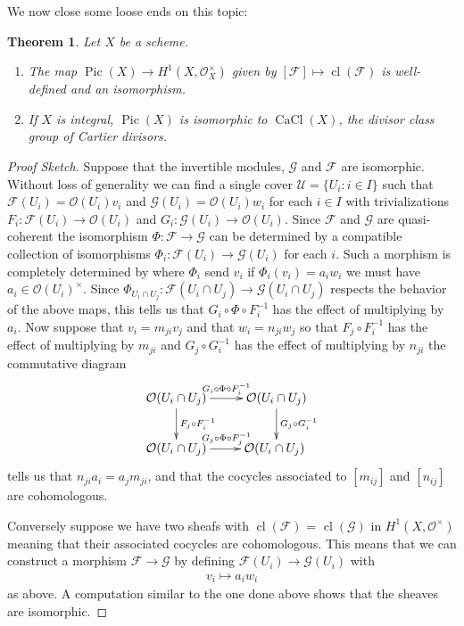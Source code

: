 \documentclass[12pt]{article}
\numberwithin{equation}{section}
\newtheorem{theorem}{Theorem}[subsection]
\theoremstyle{definition}
\theoremstyle{remark}
\newcommand{\Ocal}{\mathcal{O}}
\newcommand{\CaCl}{\operatorname{CaCl}}
\newcommand{\Pic}{\operatorname{Pic}}
\newcommand{\Fcal}{\mathcal{F}}
\newcommand{\cl}{\operatorname{cl}}
\begin{document}
We now close some loose ends on this topic:
\begin{theorem}
	Let $X$ be a scheme. 
	\begin{enumerate}
		\item 	The map $\Pic(X) \to H^1(X,\Ocal_X^{\times})$ given by $[\Fcal]\mapsto \cl(\Fcal)$ is well-defined and an isomorphism.
		\item If $X$ is integral, $\Pic(X)$ is isomorphic to $\CaCl(X)$, the divisor class group of Cartier divisors.
	\end{enumerate}
\end{theorem}
\begin{proof}[Proof Sketch]
	Suppose that the invertible modules,  $\mathcal G$ and $\mathcal F$ are isomorphic. Without loss of generality we can find a single cover $\mathcal U = \lbrace U_i : i\in I \rbrace$ such that $\mathcal F(U_i) = \mathcal O(U_i) v_i$ and $\mathcal G(U_i) = \mathcal O(U_i) w_i$ for each $i\in I$ with trivializations $F_i:\mathcal F(U_i) \to \mathcal O(U_i)$ and $G_i:\mathcal G(U_i)\to \mathcal O(U_i)$. 
	Since $\mathcal F$ and $\mathcal G$ are quasi-coherent the isomorphism $\Phi:\mathcal F\to \mathcal G$ can be determined by a compatible collection of isomorphisms $\Phi_i: \mathcal F(U_i) \to \mathcal G(U_i)$ for each $i$. 
	Such a morphism is completely determined by where $\Phi_i$ send $v_i$ if  $\Phi_i(v_i) = a_iw_i$ we must have $a_i\in \mathcal O(U_i)^{\times}$.
	Since $\Phi_{U_i\cap U_j}:\mathcal F(U_i\cap U_j)\to \mathcal G(U_i\cap U_j)$ respects the behavior of the above maps, 
	this tells us that $G_i \circ \Phi \circ F_i^{-1}$ has the effect of multiplying by $a_i$. Now suppose that $v_i=m_{ji}v_j$ and that $w_i = n_{ji}  w_j$  so that $F_{j}\circ F_i^{-1}$ has the effect of multiplying by $m_{ji}$ and $G_j\circ G_i^{-1}$ has the effect of multiplying by $n_{ji}$ the commutative diagram
	$$\xymatrix{
		\mathcal O(U_i\cap U_j) \ar[d]^{F_j\circ F_i^{-1}} \ar[r]^{G_i\circ \Phi \circ F_i^{-1} }& \mathcal O (U_i\cap U_j)\ar[d]^{G_j\circ G_i^{-1}}\\
		\mathcal O(U_i\cap U_j) \ar[r]^{G_j\circ \Phi \circ F_j^{-1}} & \mathcal O(U_i\cap U_j)\
	}$$
	tells us that $n_{ji}a_i = a_j m_{ji}$, and that the cocycles associated to $[m_{ij}]$ and $[n_{ij}]$ are cohomologous.
	
	Conversely suppose we have two sheafs with $\cl(\mathcal F)$ = $\cl(\mathcal G)$ in $H^1(X,\mathcal O^{\times})$ meaning that their associated cocycles are cohomologous. This means that we can construct a morphism $\mathcal F\to \mathcal G$ by defining $\mathcal F(U_i)\to \mathcal G(U_i)$ with 
	\begin{eqnarray*}
		v_i \mapsto a_i w_i 
	\end{eqnarray*}
	as above. A computation similar to the one done above shows that the sheaves are isomorphic. 
	

\end{proof}
\end{document}
